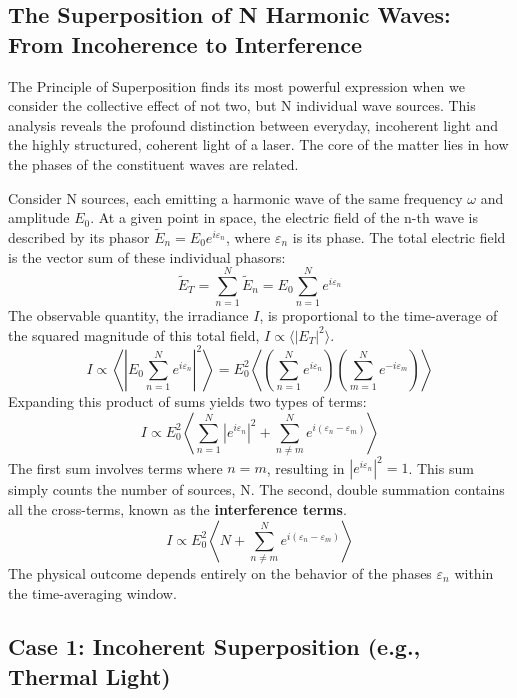 \begin{definition}
\section{The Superposition of N Harmonic Waves: From Incoherence to Interference}

The Principle of Superposition finds its most powerful expression when we consider the collective effect of not two, but N individual wave sources. This analysis reveals the profound distinction between everyday, incoherent light and the highly structured, coherent light of a laser. The core of the matter lies in how the phases of the constituent waves are related.

\begin{theorem}
Consider N sources, each emitting a harmonic wave of the same frequency $\omega$ and amplitude $E_0$. At a given point in space, the electric field of the n-th wave is described by its phasor $\tilde{E}_n = E_0 e^{i\varepsilon_n}$, where $\varepsilon_n$ is its phase. The total electric field is the vector sum of these individual phasors:
$$ \tilde{E}_T = \sum_{n=1}^{N} \tilde{E}_n = E_0 \sum_{n=1}^{N} e^{i\varepsilon_n} $$
The observable quantity, the irradiance $I$, is proportional to the time-average of the squared magnitude of this total field, $I \propto \langle |E_T|^2 \rangle$.
$$ I \propto \left\langle \left| E_0 \sum_{n=1}^{N} e^{i\varepsilon_n} \right|^2 \right\rangle = E_0^2 \left\langle \left( \sum_{n=1}^{N} e^{i\varepsilon_n} \right) \left( \sum_{m=1}^{N} e^{-i\varepsilon_m} \right) \right\rangle $$
Expanding this product of sums yields two types of terms:
$$ I \propto E_0^2 \left\langle \sum_{n=1}^{N} |e^{i\varepsilon_n}|^2 + \sum_{n \neq m}^{N} e^{i(\varepsilon_n - \varepsilon_m)} \right\rangle $$
The first sum involves terms where $n=m$, resulting in $|e^{i\varepsilon_n}|^2 = 1$. This sum simply counts the number of sources, N. The second, double summation contains all the cross-terms, known as the \textbf{interference terms}.
$$ I \propto E_0^2 \left\langle N + \sum_{n \neq m}^{N} e^{i(\varepsilon_n - \varepsilon_m)} \right\rangle $$
The physical outcome depends entirely on the behavior of the phases $\varepsilon_n$ within the time-averaging window.
\end{theorem}

\subsection{Case 1: Incoherent Superposition (e.g., Thermal Light)}


\end{definition}
